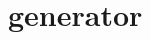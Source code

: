 \chapter{generator }
\hypertarget{md__r_e_a_d_m_e}{}\label{md__r_e_a_d_m_e}
\label{md__r_e_a_d_m_e_autotoc_md0}%
%
